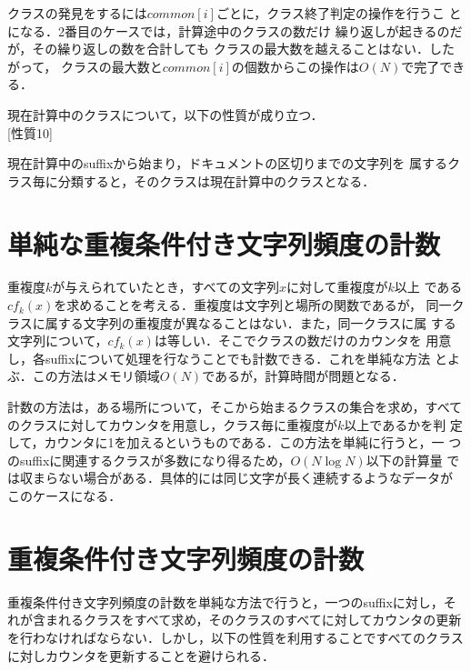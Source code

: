 クラスの発見をするには$common[i]$ごとに，クラス終了判定の操作を行うこ
とになる．2番目のケースでは，計算途中のクラスの数だけ
繰り返しが起きるのだが，その繰り返しの数を合計しても
クラスの最大数を越えることはない．したがって，
クラスの最大数と$common[i]$の個数からこの操作は$O(N)$で完了でき
る．\par


現在計算中のクラスについて，以下の性質が成り立つ．\\

[性質10]\par
現在計算中のsuffixから始まり，ドキュメントの区切りまでの文字列を
属するクラス毎に分類すると，そのクラスは現在計算中のクラスとなる．

\section{単純な重複条件付き文字列頻度の計数}

重複度$k$が与えられていたとき，すべての文字列$x$に対して重複度が$k$以上
である$cf_k(x)$を求めることを考える．重複度は文字列と場所の関数であるが，
同一クラスに属する文字列の重複度が異なることはない．また，同一クラスに属
する文字列について，$cf_k(x)$は等しい．そこでクラスの数だけのカウンタを
用意し，各suffixについて処理を行なうことでも計数できる．これを単純な方法
とよぶ．この方法はメモリ領域$O(N)$であるが，計算時間が問題となる．

\par

計数の方法は，ある場所について，そこから始まるクラスの集合を求め，すべて
のクラスに対してカウンタを用意し，クラス毎に重複度が$k$以上であるかを判
定して，カウンタに1を加えるというものである．この方法を単純に行うと，一
つのsuffixに関連するクラスが多数になり得るため，$O(N \log N)$以下の計算量
では収まらない場合がある．具体的には同じ文字が長く連続するようなデータが
このケースになる．

\par

\section{重複条件付き文字列頻度の計数}

重複条件付き文字列頻度の計数を単純な方法で行うと，一つのsuffixに対し，そ
れが含まれるクラスをすべて求め，そのクラスのすべてに対してカウンタの更新
を行わなければならない．しかし，以下の性質を利用することですべてのクラス
に対しカウンタを更新することを避けられる．\\

